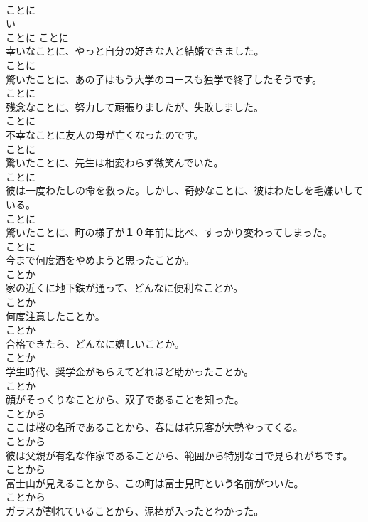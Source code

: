 \documentclass[8pt]{extreport}
\begin{document}
\begin{CJK}{UTF8}{min}
\\	ことに	
\\	い
\\	ことに	ことに
\\	幸いなことに、やっと自分の好きな人と結婚できました。	
\\	ことに
\\	驚いたことに、あの子はもう大学のコースも独学で終了したそうです。	
\\	ことに
\\	残念なことに、努力して頑張りましたが、失敗しました。	
\\	ことに
\\	不幸なことに友人の母が亡くなったのです。	
\\	ことに
\\	驚いたことに、先生は相変わらず微笑んでいた。	
\\	ことに
\\	彼は一度わたしの命を救った。しかし、奇妙なことに、彼はわたしを毛嫌いしている。	
\\	ことに
\\	驚いたことに、町の様子が１０年前に比べ、すっかり変わってしまった。	
\\	ことに
\\	今まで何度酒をやめようと思ったことか。	
\\	ことか
\\	家の近くに地下鉄が通って、どんなに便利なことか。	
\\	ことか
\\	何度注意したことか。	
\\	ことか
\\	合格できたら、どんなに嬉しいことか。	
\\	ことか
\\	学生時代、奨学金がもらえてどれほど助かったことか。	
\\	ことか
\\	顔がそっくりなことから、双子であることを知った。	
\\	ことから
\\	ここは桜の名所であることから、春には花見客が大勢やってくる。	
\\	ことから
\\	彼は父親が有名な作家であることから、範囲から特別な目で見られがちです。	
\\	ことから
\\	富士山が見えることから、この町は富士見町という名前がついた。	
\\	ことから
\\	ガラスが割れていることから、泥棒が入ったとわかった。	

\end{CJK}
\end{document}
